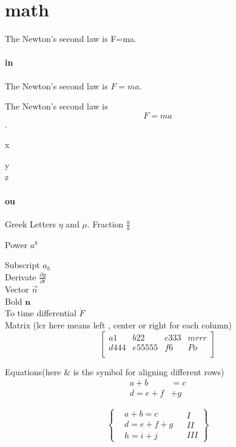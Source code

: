 \documentclass[a4paper,11pt]{book} %
\begin{document}
	\section{math}The Newton's second law is F=ma. %

	\paragraph{in} The Newton's second law is $F=ma$. %

	The Newton's second law is \[F=ma\].  %

	x

	y\\
	z

	\paragraph{ou}
	Greek Letters $\eta$ and $\mu$.
	Fraction $\frac{a}{b}$

	Power $a^b$

	Subscript $a_b$\\
	Derivate $\frac{\partial y}{\partial t}$\\
	Vector $\vec{n}$\\
	Bold $\mathbf{n}$\\
	To time differential $\dot{F}$\\
	Matrix (lcr here means left , center or right for each column)
	\[
		\left[
			\begin{array}{llcr}
				a1 & b22 & c333 & mrrr\\
				d444 & e55555 & f6 & Po\\
			\end{array}
		\right]
	\]

	Equations(here \& is the symbol for aligning different rows)
	\begin{align}
		a+b&=c\\
		d=e+f&+g
	\end{align}

	\[
		\left\{ %
			\begin{aligned}
				&a+b=c\\
				&d=e+f+g\\
				&h=i+j
			\end{aligned} %
			\begin{aligned}
				&I \\
				&II\\
				&III
			\end{aligned}
		\right\}%
	\]
	
\end{document}
